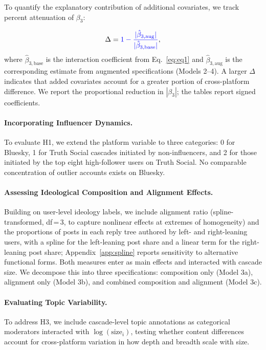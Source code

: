 \documentclass[letterpaper]{article} %
\newcommand{\rev}[1]{{\color{blue}#1}}
\begin{document}
To quantify the explanatory contribution of additional covariates, we track percent attenuation of $\beta_3$:

\begin{equation}
\Delta = \rev{1 - \frac{|\hat{\beta}_{3,\text{aug}}|}{|\hat{\beta}_{3,\text{base}}|}} ,
\end{equation}
where $\hat{\beta}_{3,\text{base}}$ is the interaction coefficient from Eq.~\ref{eq:eq1} and $\hat{\beta}_{3,\text{aug}}$ is the corresponding estimate from augmented specifications (Models 2--4). A larger $\Delta$ indicates that added covariates account for a greater portion of cross-platform difference. \rev{We report the proportional reduction in $|\beta_3|$; the tables report signed coefficients.}

\paragraph*{Incorporating Influencer Dynamics.}
To evaluate H1, we extend the platform variable to three categories: 0 for Bluesky, 1 for Truth Social cascades initiated by non-influencers, and 2 for those initiated by the top eight high-follower users on Truth Social. No comparable concentration of outlier accounts exists on Bluesky.

\paragraph*{Assessing Ideological Composition and Alignment Effects.}
Building on user-level ideology labels, we include alignment ratio (spline-transformed, df\,=\,3, to capture nonlinear effects at extremes of homogeneity) and \rev{the proportions of posts in each reply tree authored by left- and right-leaning users, with a spline for the left-leaning post share and a linear term for the right-leaning post share; Appendix~\ref{app:spline} reports sensitivity to alternative functional forms}. \rev{Both measures enter as main effects and interacted with cascade size.} We decompose this into three specifications: composition only (Model 3a), alignment only (Model 3b), and combined composition and alignment (Model 3c). 

\paragraph*{Evaluating Topic Variability.}
To address H3, we include cascade-level topic annotations as categorical moderators \rev{interacted with $\log(\text{size}_i)$}, testing whether content differences account for cross-platform variation in how depth and breadth scale with size.
\end{document}

